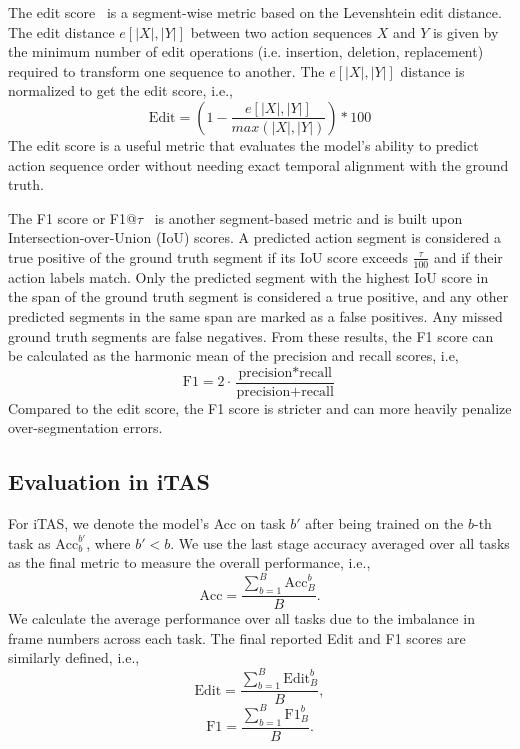 The edit score~\cite{lea2016segmentscore} is a segment-wise metric based on the Levenshtein edit distance.  The edit distance $e[|X|,|Y|]$ between two action sequences $X$ and $Y$ is given by the minimum number of edit operations (i.e. insertion, deletion, replacement) required to transform one sequence to another. The $e[|X|,|Y|]$ distance is normalized to get the edit score, i.e.,
\begin{equation}
    \text{Edit} = \left( 1 - \frac{e[|X|,|Y|]}{max(|X|,|Y|)} \right) * 100
\end{equation}
The edit score is a useful metric that evaluates the model's ability to predict action sequence order without needing exact temporal alignment with the ground truth.

The F1 score or F1@$\tau$~\cite{lea2017tcn} is another segment-based metric and is built upon Intersection-over-Union (IoU) scores. A predicted action segment is considered a true positive of the ground truth segment if its IoU score exceeds $\frac{\tau}{100}$ and if their action labels match. Only the predicted segment with the highest IoU score in the span of the ground truth segment is considered a true positive, and any other predicted segments in the same span are marked as a false positives. Any missed ground truth segments are false negatives. From these results, the F1 score can be calculated as the harmonic mean of the precision and recall scores, i.e,
\begin{equation}
    \text{F1} = 2 \cdot \frac{\text{precision} * \text{recall}}{\text{precision} + \text{recall}}
\end{equation}
Compared to the edit score, the F1 score is stricter and can more heavily penalize over-segmentation errors.

\subsection{Evaluation in iTAS}

For iTAS, we denote the model's Acc on task $b'$ after being trained on the $b$-th task as $\text{Acc}_b^{b'}$, where $b'< b$. We use the last stage accuracy averaged over all tasks as the final metric to measure the overall performance, i.e., 
\begin{equation*}
    \text{Acc} = \frac {\sum_{b=1}^B \text{Acc}_B^b} {B}.
\end{equation*}
We calculate the average performance over all tasks due to the imbalance in frame numbers across each task. The final reported Edit and F1 scores are similarly defined, i.e., 
\begin{equation*}
    \text{Edit} = \frac {\sum_{b=1}^B \text{Edit}_B^b} {B},
\end{equation*}
\begin{equation*}
    \text{F1} = \frac {\sum_{b=1}^B \text{F1}_B^b} {B}.
\end{equation*}

